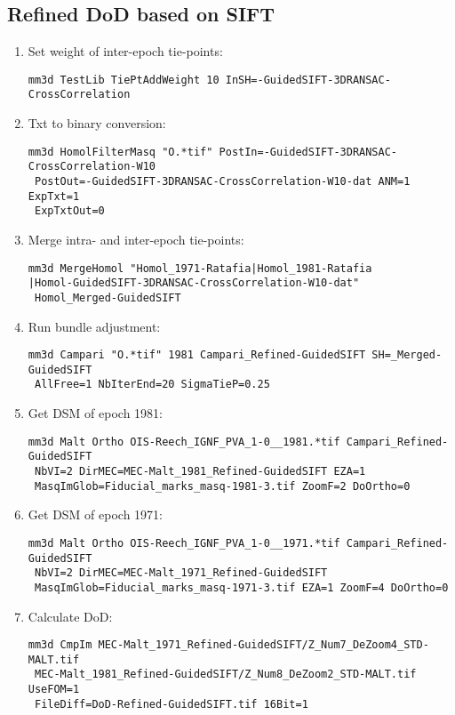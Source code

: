 \subsection{Refined DoD based on SIFT}
\begin{enumerate}

\item{Set weight of inter-epoch tie-points:}
\begin{verbatim}
mm3d TestLib TiePtAddWeight 10 InSH=-GuidedSIFT-3DRANSAC-CrossCorrelation
\end{verbatim}
\item{Txt to binary conversion:}
\begin{verbatim}
mm3d HomolFilterMasq "O.*tif" PostIn=-GuidedSIFT-3DRANSAC-CrossCorrelation-W10 
 PostOut=-GuidedSIFT-3DRANSAC-CrossCorrelation-W10-dat ANM=1 ExpTxt=1 
 ExpTxtOut=0
\end{verbatim}
\item{Merge intra- and inter-epoch tie-points:}
\begin{verbatim}
mm3d MergeHomol "Homol_1971-Ratafia|Homol_1981-Ratafia
|Homol-GuidedSIFT-3DRANSAC-CrossCorrelation-W10-dat"
 Homol_Merged-GuidedSIFT
\end{verbatim}
\item{Run bundle adjustment:}
\begin{verbatim}
mm3d Campari "O.*tif" 1981 Campari_Refined-GuidedSIFT SH=_Merged-GuidedSIFT
 AllFree=1 NbIterEnd=20 SigmaTieP=0.25
\end{verbatim}
\item{Get \ac{DSM} of epoch 1981:}
\begin{verbatim}
mm3d Malt Ortho OIS-Reech_IGNF_PVA_1-0__1981.*tif Campari_Refined-GuidedSIFT 
 NbVI=2 DirMEC=MEC-Malt_1981_Refined-GuidedSIFT EZA=1
 MasqImGlob=Fiducial_marks_masq-1981-3.tif ZoomF=2 DoOrtho=0
\end{verbatim}
\item{Get \ac{DSM} of epoch 1971:}
\begin{verbatim}
mm3d Malt Ortho OIS-Reech_IGNF_PVA_1-0__1971.*tif Campari_Refined-GuidedSIFT 
 NbVI=2 DirMEC=MEC-Malt_1971_Refined-GuidedSIFT
 MasqImGlob=Fiducial_marks_masq-1971-3.tif EZA=1 ZoomF=4 DoOrtho=0
\end{verbatim}
\item{Calculate DoD:}
\begin{verbatim}
mm3d CmpIm MEC-Malt_1971_Refined-GuidedSIFT/Z_Num7_DeZoom4_STD-MALT.tif 
 MEC-Malt_1981_Refined-GuidedSIFT/Z_Num8_DeZoom2_STD-MALT.tif UseFOM=1 
 FileDiff=DoD-Refined-GuidedSIFT.tif 16Bit=1
\end{verbatim}
\end{enumerate}

